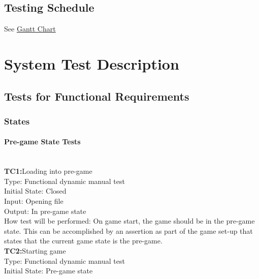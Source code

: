 \documentclass[12pt, titlepage]{article}
\begin{document}
\subsection{Testing Schedule}

See \href{https://gitlab.cas.mcmaster.ca/nagyj2/Staroids/tree/master/ProjectSchedule/StaroidsGantt.pdf}{Gantt Chart}

\section{System Test Description}

\subsection{Tests for Functional Requirements}

\subsubsection{States}

\paragraph{Pre-game State Tests\\\\}

\textbf{TC1:}Loading into pre-game\\

Type: Functional dynamic manual test\\

Initial State: Closed\\

Input: Opening file\\

Output: In pre-game state\\

How test will be performed: On game start, the game should be in the pre-game state. This can be accomplished by an assertion as part of the game set-up that states that the current game state is the pre-game.\\

\textbf{TC2:}Starting game\\

Type: Functional dynamic manual test\\

Initial State: Pre-game state\\
\end{document}
